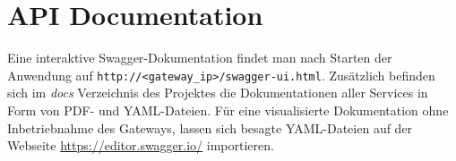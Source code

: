 \section{API Documentation}

Eine interaktive Swagger-Dokumentation findet man nach Starten der Anwendung auf \verb|http://<gateway_ip>/swagger-ui.html|.
Zusätzlich befinden sich im \textit{docs} Verzeichnis des Projektes die Dokumentationen aller Services in Form von PDF- und YAML-Dateien.
Für eine visualisierte Dokumentation ohne Inbetriebnahme des Gateways, lassen sich besagte YAML-Dateien auf der Webseite \href{https://editor.swagger.io/}{https://editor.swagger.io/} importieren. 

